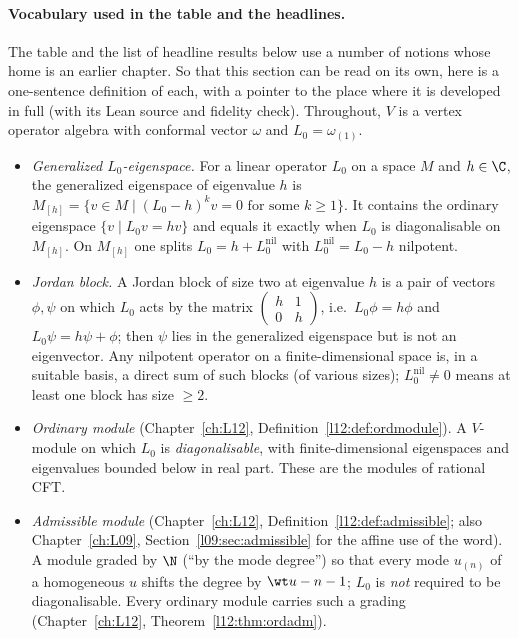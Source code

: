 \paragraph{Vocabulary used in the table and the headlines.} The table and the list of headline
results below use a number of notions whose home is an earlier chapter. So that this section can be
read on its own, here is a one-sentence definition of each, with a pointer to the place where it is
developed in full (with its Lean source and fidelity check). Throughout, $V$ is a vertex operator
algebra with conformal vector $\omega$ and $L_0=\omega_{(1)}$.
\begin{itemize}
\item \emph{Generalized $L_0$-eigenspace.} For a linear operator $L_0$ on a space $M$ and
  $h\in\C$, the generalized eigenspace of eigenvalue $h$ is
  $M_{[h]}=\{v\in M\mid (L_0-h)^k v=0\text{ for some }k\ge1\}$. It contains the ordinary eigenspace
  $\{v\mid L_0v=hv\}$ and equals it exactly when $L_0$ is diagonalisable on $M_{[h]}$. On
  $M_{[h]}$ one splits $L_0=h+L_0^{\mathrm{nil}}$ with $L_0^{\mathrm{nil}}=L_0-h$ nilpotent.
\item \emph{Jordan block.} A Jordan block of size two at eigenvalue $h$ is a pair of vectors
  $\phi,\psi$ on which $L_0$ acts by the matrix $\left(\begin{smallmatrix}h&1\\0&h\end{smallmatrix}\right)$,
  i.e.\ $L_0\phi=h\phi$ and $L_0\psi=h\psi+\phi$; then $\psi$ lies in the generalized eigenspace but
  is not an eigenvector. Any nilpotent operator on a finite-dimensional space is, in a suitable basis,
  a direct sum of such blocks (of various sizes); $L_0^{\mathrm{nil}}\neq0$ means at least one block
  has size $\ge2$.
\item \emph{Ordinary module} (Chapter~\ref{ch:L12}, Definition~\ref{l12:def:ordmodule}). A
  $V$-module on which $L_0$ is \emph{diagonalisable}, with finite-dimensional eigenspaces and
  eigenvalues bounded below in real part. These are the modules of rational CFT.
\item \emph{Admissible module} (Chapter~\ref{ch:L12}, Definition~\ref{l12:def:admissible}; also
  Chapter~\ref{ch:L09}, Section~\ref{l09:sec:admissible} for the affine use of the word). A module
  graded by $\N$ (``by the mode degree'') so that every mode $u_{(n)}$ of a homogeneous $u$ shifts the
  degree by $\wt u-n-1$; $L_0$ is \emph{not} required to be diagonalisable. Every ordinary module
  carries such a grading (Chapter~\ref{ch:L12}, Theorem~\ref{l12:thm:ordadm}).

\end{itemize}
